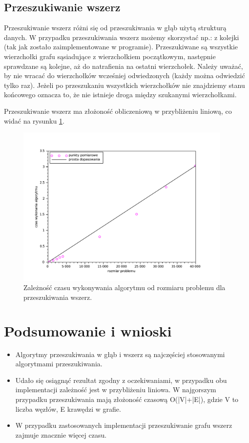 \documentclass{mwart}
\begin{document}
\subsection{Przeszukiwanie wszerz}
Przeszukiwanie wszerz różni się od przeszukiwania w głąb użytą strukturą danych. W przypadku przeszukiwania wszerz możemy skorzystać np.: z kolejki (tak jak zostało zaimplementowane w programie). Przeszukiwane są wszystkie wierzchołki grafu sąsiadujące z wierzchołkiem początkowym, następnie sprawdzane są kolejne, aż do natrafienia na ostatni wierzchołek. Należy uważać, by nie wracać do wierzchołków wcześniej odwiedzonych (każdy można odwiedzić tylko raz). Jeżeli po przeszukaniu wszystkich wierzchołków nie znajdziemy stanu końcowego oznacza to, że nie istnieje droga między szukanymi wierzchołkami.

Przeszukiwanie wszerz ma złożoność obliczeniową w przybliżeniu liniową, co widać na rysunku \ref{fbfs}.

\begin{figure}[!htp]
\centering
\includegraphics[width=0.95\textwidth]{bfs.pdf}
\caption{Zależność czasu wykonywania algorytmu od rozmiaru problemu dla przeszukiwania wszerz. \label{fbfs}} 
\end{figure}

\section{Podsumowanie i wnioski}
\begin{itemize}
\item Algorytmy przeszukiwania w głąb i wszerz są najczęściej stosowanymi algorytmami przeszukiwania.
\item Udało się osiągnąć rezultat zgodny z oczekiwaniami, w przypadku obu implementacji zależność jest w przybliżeniu liniowa. W najgorszym przypadku przeszukiwania mają złożoność czasową O(|V|+|E|), gdzie V to liczba węzłów, E krawędzi w grafie.
\item W przypadku zastosowanych implementacji przeszukiwanie grafu wszerz zajmuje znacznie więcej czasu.

\end{itemize}
\end{document}
